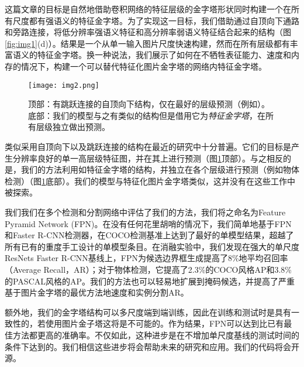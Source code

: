\documentclass[../main.tex]{subfile}
\begin{document}
这篇文章的目标是自然地借助卷积网络的特征层级的金字塔形状同时构建一个在所有尺度都有强语义的特征金字塔。为了实现这一目标，我们借助通过自顶向下通路和旁路连接，将低分辨率强语义特征和高分辨率弱语义特征结合起来的结构（图\ref{fig:img1}(d)）。结果是一个从单一输入图片尺度快速构建，然而在所有层级都有丰富语义的特征金字塔。换一种说法，我们展示了如何在不牺牲表征能力、速度和内存的情况下，构建一个可以替代特征化图片金字塔的网络内特征金字塔。

\begin{figure}[htb]
    \centering
    \texttt{[image: img2.png]}
    \caption{顶部：有跳跃连接的自顶向下结构，仅在最好的层级预测（例如\cite{refinesegment}）。底部：我们的模型与之有类似的结构但是借用它为\textit{特征金字塔}，在所有层级独立做出预测。}
    \label{fig:img2}
\end{figure}

类似采用自顶向下以及跳跃连接的结构在最近的研究中十分普遍。它们的目标是产生分辨率良好的单一高层级特征图，并在其上进行预测（图\ref{fig:img2}顶部）。与之相反的是，我们的方法利用如特征金字塔的结构，并独立在各个层级进行预测（例如物体检测）（图\ref{fig:img2}底部）。我们的模型与特征化图片金字塔类似，这并没有在这些工作中被探索。

我们我们在多个检测和分割网络\cite{fastrcnn,fasterrcnn,segmentproposal}中评估了我们的方法，我们将之命名为Feature Pyramid Network (FPN)。在没有任何花里胡哨的情况下，我们简单地基于FPN和Faster R-CNN检测器，在COCO检测基准上达到了最好的单模型结果，超越了所有已有的重度手工设计的单模型条目。在消融实验中，我们发现在强大的单尺度ResNets Faster R-CNN基线上，FPN为候选边界框生成提高了8\%地平均召回率（Average Recall，AR）；对于物体检测，它提高了2.3\%的COCO风格AP和3.8\%的PASCAL风格的AP。我们的方法也可以轻易地扩展到掩码候选，并提高了严重基于图片金字塔的最优方法地速度和实例分割AR。

额外地，我们的金字塔结构可以多尺度端到端训练，因此在训练和测试时是具有一致性的，若使用图片金子塔这将是不可能的。作为结果，FPN可以达到比已有最佳方法都更高的准确率。不仅如此，这种进步是在不增加单尺度基线的测试时间的条件下达到的。我们相信这些进步将会帮助未来的研究和应用。我们的代码将会开源。
\end{document}
